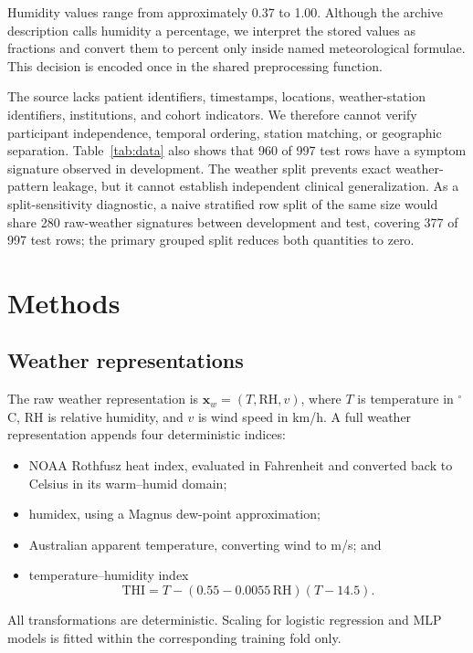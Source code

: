 \documentclass[conference]{IEEEtran}
\begin{document}
Humidity values range from approximately 0.37 to 1.00. Although the archive
description calls humidity a percentage, we interpret the stored values as
fractions and convert them to percent only inside named meteorological
formulae. This decision is encoded once in the shared preprocessing function.

The source lacks patient identifiers, timestamps, locations, weather-station
identifiers, institutions, and cohort indicators. We therefore cannot verify
participant independence, temporal ordering, station matching, or geographic
separation. Table~\ref{tab:data} also shows that 960 of 997 test rows have a
symptom signature observed in development. The weather split prevents exact
weather-pattern leakage, but it cannot establish independent clinical
generalization. As a split-sensitivity diagnostic, a naive stratified row split
of the same size would share 280 raw-weather signatures between development
and test, covering 377 of 997 test rows; the primary grouped split reduces both
quantities to zero.

\section{Methods}

\subsection{Weather representations}

The raw weather representation is
$\mathbf{x}_{w}=(T,\mathrm{RH},v)$, where $T$ is temperature in
$^\circ$C, RH is relative humidity, and $v$ is wind speed in km/h. A full
weather representation appends four deterministic indices:

\begin{itemize}
    \item NOAA Rothfusz heat index, evaluated in Fahrenheit and converted back
    to Celsius in its warm--humid domain;
    \item humidex, using a Magnus dew-point approximation;
    \item Australian apparent temperature, converting wind to m/s; and
    \item temperature--humidity index
    \begin{equation}
    \mathrm{THI}=T-(0.55-0.0055\,\mathrm{RH})(T-14.5).
    \end{equation}
\end{itemize}

All transformations are deterministic. Scaling for logistic regression and
MLP models is fitted within the corresponding training fold only.
\end{document}
